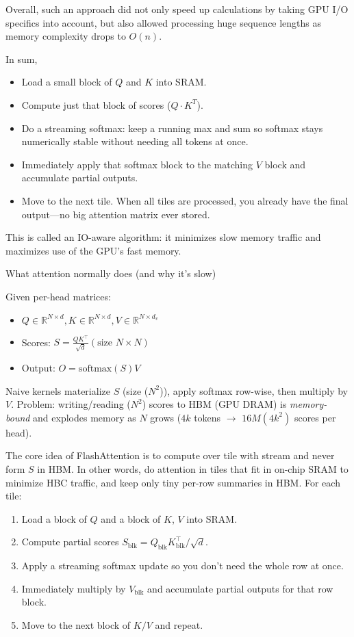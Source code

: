 Overall, such an approach did not only speed up calculations by taking GPU I/O specifics into account, but also allowed processing huge sequence lengths as memory complexity drops to $O(n)$.

In sum,
\begin{itemize}
	\item Load a small block of $Q$ and $K$ into SRAM.
	\item Compute just that block of scores ($Q\cdot K^T$).
	\item Do a streaming softmax: keep a running max and sum so softmax stays numerically stable without needing all tokens at once.
	\item Immediately apply that softmax block to the matching $V$ block and accumulate partial outputs.
	\item Move to the next tile. When all tiles are processed, you already have the final output—no big attention matrix ever stored.
\end{itemize}
This is called an IO-aware algorithm: it minimizes slow memory traffic and maximizes use of the GPU's fast memory.

What attention normally does (and why it's slow)

Given per-head matrices:
\begin{itemize}
	\item$Q \in \mathbb{R}^{N\times d}, K \in \mathbb{R}^{N\times d}, V \in \mathbb{R}^{N\times d_v}$ 
	\item Scores: $S = \frac{QK^\top}{\sqrt{d}}  (\text{size } N\times N)$
	\item Output: $O = \mathrm{softmax}(S)V$
\end{itemize}
Naive kernels materialize $S$ (size ($N^2$)), apply softmax row-wise, then multiply by $V$.
Problem: writing/reading ($N^2$) scores to HBM (GPU DRAM) is \textit{memory-bound} and explodes memory as $N$ grows (\eg $4k$ tokens $\to$ $16M (4k^2)$ scores per head).

The core idea of FlashAttention is to compute over tile with stream and never form $S$ in HBM. In other words, do attention in tiles that fit in on-chip SRAM to minimize HBC traffic, and keep only tiny per-row summaries in HBM. For each tile:

\begin{enumerate}
	\item Load a block of $Q$ and a block of $K$, $V$ into SRAM.
	\item Compute partial scores $S_{\text{blk}} = Q_{\text{blk}}K_{\text{blk}}^\top/\sqrt{d}$.
	\item Apply a streaming softmax update so you don't need the whole row at once.
	\item Immediately multiply by $V_{\text{blk}}$ and accumulate partial
		outputs for that row block.
	\item Move to the next block of $K/V$ and repeat.
\end{enumerate}

